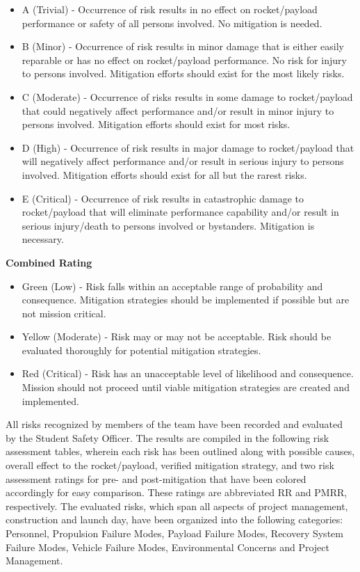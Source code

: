 		\begin{itemize}
			\item A (Trivial) - Occurrence of risk results in no effect on rocket/payload performance or safety of all persons involved. No mitigation is needed.
			\item B (Minor) - Occurrence of risk results in minor damage that is either easily reparable or has no effect on rocket/payload performance. No risk for injury to persons involved. Mitigation efforts should exist for the most likely risks.
			\item C (Moderate) - Occurrence of risks results in some damage to rocket/payload that could negatively affect performance and/or result in minor injury to persons involved. Mitigation efforts should exist for most risks.
			\item D (High) - Occurrence of risk results in major damage to rocket/payload that will negatively affect performance and/or result in serious injury to persons involved. Mitigation efforts should exist for all but the rarest risks.
			\item E (Critical) - Occurrence of risk results in catastrophic damage to rocket/payload that will eliminate performance capability and/or result in serious injury/death to persons involved or bystanders. Mitigation is necessary.
		\end{itemize}
		
		\textbf{Combined Rating}
	
		\begin{itemize}
			\item Green (Low) - Risk falls within an acceptable range of probability and consequence. Mitigation strategies should be implemented if possible but are not mission critical.
			\item Yellow (Moderate) - Risk may or may not be acceptable. Risk should be evaluated thoroughly for potential mitigation strategies.
			\item Red (Critical) - Risk has an unacceptable level of likelihood and consequence. Mission should not proceed until viable mitigation strategies are created and implemented.
		\end{itemize}
		
		All risks recognized by members of the team have been recorded and evaluated by the Student Safety Officer. The results are compiled in the following risk assessment tables, wherein each risk has been outlined along with possible causes, overall effect to the rocket/payload, verified mitigation strategy, and two risk assessment ratings for pre- and post-mitigation that have been colored accordingly for easy comparison. These ratings are abbreviated RR and PMRR, respectively. The evaluated risks, which span all aspects of project management, construction and launch day, have been organized into the following categories: Personnel, Propulsion Failure Modes, Payload Failure Modes, Recovery System Failure Modes, Vehicle Failure Modes, Environmental Concerns and Project Management.
		\bigbreak
	
	\pagebreak
	
	\pagebreak

